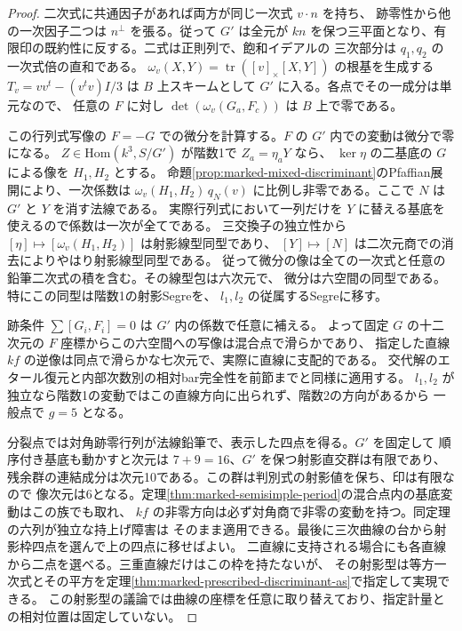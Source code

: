 \begin{proof}
二次式に共通因子があれば両方が同じ一次式 $v\cdot n$ を持ち、
跡零性から他の一次因子二つは $n^\perp$ を張る。従って $G'$ は全元が
$kn$ を保つ三平面となり、有限印の既約性に反する。二式は正則列で、飽和イデアルの
三次部分は $q_1,q_2$ の一次式倍の直和である。
$\omega_v(X,Y)=\operatorname{tr}([v]_\times[X,Y])$ の根基を生成する
$T_v=vv^t-(v^tv)I/3$ は $B$ 上スキームとして $G'$ に入る。各点でその一成分は単元なので、
任意の $F$ に対し $\det(\omega_v(G_a,F_c))$ は $B$ 上で零である。

この行列式写像の $F=-G$ での微分を計算する。$F$ の $G'$ 内での変動は微分で零になる。
$Z\in\mathrm{Hom}(k^3,S/G')$ が階数1で $Z_a=\eta_a Y$ なら、
$\ker\eta$ の二基底の $G$ による像を $H_1,H_2$ とする。
命題\ref{prop:marked-mixed-discriminant}のPfaffian展開により、一次係数は
$\omega_v(H_1,H_2)\, q_N(v)$ に比例し非零である。ここで $N$ は $G'$ と $Y$ を消す法線である。
実際行列式において一列だけを $Y$ に替える基底を使えるので係数は一次が全てである。
三交換子の独立性から $[\eta]\mapsto[\omega_v(H_1,H_2)]$ は射影線型同型であり、
$[Y]\mapsto[N]$ は二次元商での消去によりやはり射影線型同型である。
従って微分の像は全ての一次式と任意の鉛筆二次式の積を含む。その線型包は六次元で、
微分は六空間の同型である。特にこの同型は階数1の射影Segreを、
$l_1,l_2$ の従属するSegreに移す。

跡条件 $\sum[G_i,F_i]=0$ は $G'$ 内の係数で任意に補える。
よって固定 $G$ の十二次元の $F$ 座標からこの六空間への写像は混合点で滑らかであり、
指定した直線 $kf$ の逆像は同点で滑らかな七次元で、実際に直線に支配的である。
交代解のエタール復元と内部次数別の相対bar完全性を前節までと同様に適用する。
$l_1,l_2$ が独立なら階数1の変動ではこの直線方向に出られず、階数2の方向があるから
一般点で $g=5$ となる。

分裂点では対角跡零行列が法線鉛筆で、表示した四点を得る。$G'$ を固定して
順序付き基底も動かすと次元は $7+9=16$、$G'$ を保つ射影直交群は有限であり、
残余群の連結成分は次元10である。この群は判別式の射影値を保ち、印は有限なので
像次元は6となる。定理\ref{thm:marked-semisimple-period}の混合点内の基底変動はこの族でも取れ、
$kf$ の非零方向は必ず対角商で非零の変動を持つ。同定理の六列が独立な持上げ障害は
そのまま適用できる。最後に三次曲線の台から射影枠四点を選んで上の四点に移せばよい。
二直線に支持される場合にも各直線から二点を選べる。三重直線だけはこの枠を持たないが、
その射影型は等方一次式とその平方を定理\ref{thm:marked-prescribed-discriminant-as}で指定して実現できる。
この射影型の議論では曲線の座標を任意に取り替えており、指定計量との相対位置は固定していない。
\end{proof}

